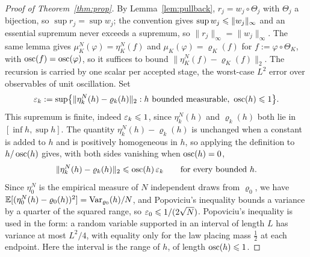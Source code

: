 \documentclass{article}
\begin{document}
\begin{proof}[Proof of Theorem~\ref{thm:prop}]
By Lemma~\ref{lem:pullback}, $r_j=w_j\circ\Theta_j$ with $\Theta_j$ a bijection, so $\sup r_j=\sup w_j$; the convention gives $\sup w_j\leqslant\lVert w_j\rVert_\infty$ and an essential supremum never exceeds a supremum, so $\lVert r_j\rVert_\infty=\lVert w_j\rVert_\infty$. The same lemma gives $\mu_K^N(\varphi)=\eta_K^N(f)$ and $\mu_K(\varphi)=\varrho_K(f)$ for $f:=\varphi\circ\Theta_K$, with $\operatorname{osc}(f)=\operatorname{osc}(\varphi)$, so it suffices to bound $\lVert\eta_K^N(f)-\varrho_K(f)\rVert_2$. The recursion is carried by one scalar per accepted stage, the worst-case $L^2$ error over observables of unit oscillation. Set
\begin{equation*}
    \varepsilon_k := \sup\bigl\{\lVert\eta_k^N(h)-\varrho_k(h)\rVert_2 : h \text{ bounded measurable},\ \operatorname{osc}(h)\leqslant1\bigr\}.
\end{equation*}
This supremum is finite, indeed $\varepsilon_k\leqslant1$, since $\eta_k^N(h)$ and $\varrho_k(h)$ both lie in $[\inf h,\sup h]$. The quantity $\eta_k^N(h)-\varrho_k(h)$ is unchanged when a constant is added to $h$ and is positively homogeneous in $h$, so applying the definition to $h/\operatorname{osc}(h)$ gives, with both sides vanishing when $\operatorname{osc}(h)=0$,
\begin{equation}
    \lVert\eta_k^N(h)-\varrho_k(h)\rVert_2 \leqslant \operatorname{osc}(h)\,\varepsilon_k
    \qquad\text{for every bounded } h.
    \label{eq: appendix-eps}
\end{equation}
Since $\eta_0^N$ is the empirical measure of $N$ independent draws from $\varrho_0$, we have $\mathbb E[(\eta_0^N(h)-\varrho_0(h))^2]=\operatorname{Var}_{\varrho_0}(h)/N$, and Popoviciu's inequality bounds a variance by a quarter of the squared range, so $\varepsilon_0\leqslant 1/(2\sqrt N)$. {\color{red}Popoviciu's inequality is used in the form: a random variable supported in an interval of length $L$ has variance at most $L^2/4$, with equality only for the law placing mass $\tfrac12$ at each endpoint. Here the interval is the range of $h$, of length $\operatorname{osc}(h)\leqslant1$.}


\end{proof}
\end{document}
